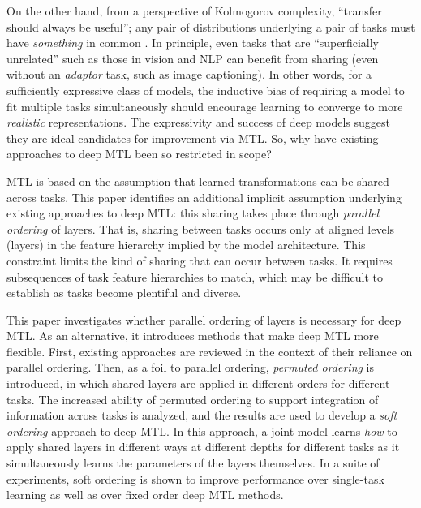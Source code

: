 \documentclass{article}
\theoremstyle{definition}
\theoremstyle{remark}
\begin{document}
On the other hand, from a perspective of Kolmogorov complexity, ``transfer should always be useful''; any pair of distributions underlying a pair of tasks must have \emph{something} in common \citep{Mahmud:2009,Mahmud:2008}.
In principle, even tasks that are ``superficially unrelated'' such as those in vision and NLP can benefit from sharing (even without an \emph{adaptor} task, such as image captioning).
In other words, for a sufficiently expressive class of models, the inductive bias of requiring a model to fit multiple tasks simultaneously should encourage learning to converge to more \emph{realistic} representations. 
The expressivity and success of deep models suggest they are ideal candidates for improvement via MTL.
So, why have existing approaches to deep MTL been so restricted in scope?

MTL is based on the assumption that learned transformations can be shared across tasks.
This paper identifies an additional implicit assumption underlying existing approaches to deep MTL: this sharing takes place through \emph{parallel ordering} of layers. 
That is, sharing between tasks occurs only at aligned levels (layers) in the feature hierarchy implied by the model architecture.
This constraint limits the kind of sharing that can occur between tasks. It requires subsequences of task feature hierarchies to match, which may be difficult to establish as tasks become plentiful and diverse.

This paper investigates whether parallel ordering of layers is necessary for deep MTL. As an alternative, it introduces methods that make deep MTL more flexible.
First, existing approaches are reviewed in the context of their reliance on parallel ordering.
Then, as a foil to parallel ordering, \emph{permuted ordering} is introduced, in which shared layers are applied in different orders for different tasks.
The increased ability of permuted ordering to support integration of information across tasks is analyzed, and the results are used to develop a \emph{soft ordering} approach to deep MTL. In this approach, a joint model learns \emph{how} to apply shared layers in different ways at different depths for different tasks as it simultaneously learns the parameters of the layers themselves.
In a suite of experiments, soft ordering is shown to improve performance over single-task learning as well as over fixed order deep MTL methods.
\end{document}
